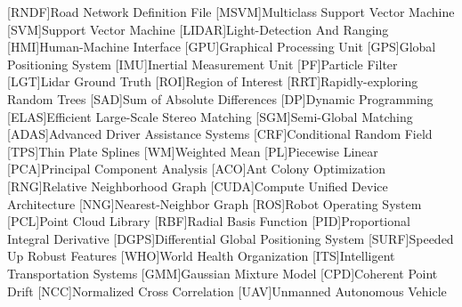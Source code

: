 [RNDF]{Road Network Definition File}
[MSVM]{Multiclass Support Vector Machine}
[SVM]{Support Vector Machine}
[LIDAR]{Light-Detection And Ranging}
[HMI]{Human-Machine Interface}
[GPU]{Graphical Processing Unit}
[GPS]{Global Positioning System}
[IMU]{Inertial Measurement Unit}
[PF]{Particle Filter}
[LGT]{Lidar Ground Truth}
[ROI]{Region of Interest}
[RRT]{Rapidly-exploring Random Trees}
[SAD]{Sum of Absolute Differences}
[DP]{Dynamic Programming}
[ELAS]{Efficient Large-Scale Stereo Matching}
[SGM]{Semi-Global Matching}
[ADAS]{Advanced Driver Assistance Systems}
[CRF]{Conditional Random Field}
[TPS]{Thin Plate Splines}
[WM]{Weighted Mean}
[PL]{Piecewise Linear}
[PCA]{Principal Component Analysis}
[ACO]{Ant Colony Optimization}
[RNG]{Relative Neighborhood Graph}
[CUDA]{Compute Unified Device Architecture}
[NNG]{Nearest-Neighbor Graph}
[ROS]{Robot Operating System}
[PCL]{Point Cloud Library}
[RBF]{Radial Basis Function}
[PID]{Proportional Integral Derivative}
[DGPS]{Differential Global Positioning System}
[SURF]{Speeded Up Robust Features}
[WHO]{World Health Organization}
[ITS]{Intelligent Transportation Systems}
[GMM]{Gaussian Mixture Model}
[CPD]{Coherent Point Drift}
[NCC]{Normalized Cross Correlation}
[UAV]{Unmanned Autonomous Vehicle}


